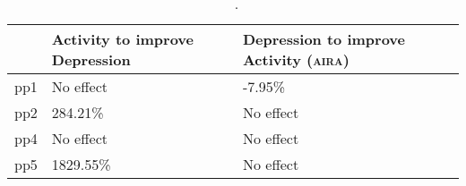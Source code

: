 \begin{table}[ht]
\centering
\begin{tabular}{rll}
  \toprule
 & Activity to improve Depression & Depression to improve Activity (\textsc{aira}) \\ 
  \midrule
pp1 & No effect & -7.95\% \\ 
  pp2 & 284.21\% & No effect \\ 
  pp4 & No effect & No effect \\ 
  pp5 & 1829.55\% & No effect \\ 
   \bottomrule
\end{tabular}
\caption{\citeauthor{RefWorks:4}~\cite{RefWorks:4}.} 
\label{tab:effects}
\end{table}
